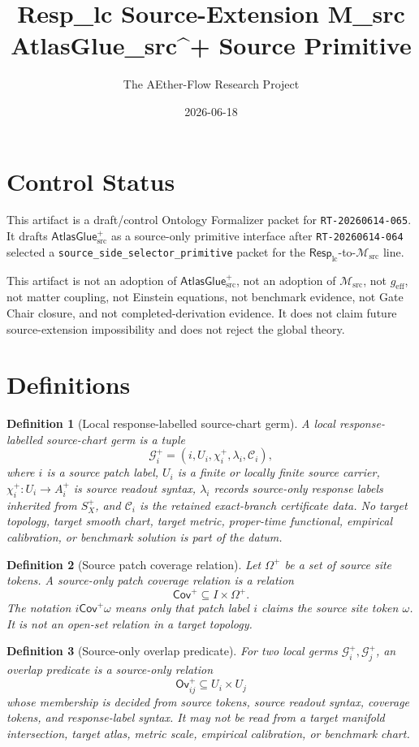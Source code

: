 \documentclass[11pt]{article}
\title{Resp\_lc Source-Extension M\_src AtlasGlue\_src\^{}+ Source Primitive}
\author{The AEther-Flow Research Project}
\date{2026-06-18}
\newcommand{\RespLC}{\mathsf{Resp}_{\mathrm{lc}}}
\newcommand{\Msrc}{\mathcal{M}_{\mathrm{src}}}
\newcommand{\geff}{g_{\mathrm{eff}}}
\newcommand{\Splus}{S_X^+}
\newcommand{\AtlasGlue}{\mathsf{AtlasGlue}_{\mathrm{src}}^{+}}
\newcommand{\Cov}{\mathsf{Cov}^{+}}
\newcommand{\Ov}{\mathsf{Ov}^{+}}
\newcommand{\Germ}{\mathcal{G}^{+}}
\newtheorem{definition}{Definition}
\begin{document}
\maketitle

\section*{Control Status}

This artifact is a draft/control Ontology Formalizer packet for
\texttt{RT-20260614-065}. It drafts \(\AtlasGlue\) as a source-only primitive
interface after \texttt{RT-20260614-064} selected a
\texttt{source\_side\_selector\_primitive} packet for the
\(\RespLC\)-to-\(\Msrc\) line.

This artifact is not an adoption of \(\AtlasGlue\), not an adoption of
\(\Msrc\), not \(\geff\), not matter coupling, not Einstein equations, not
benchmark evidence, not Gate Chair closure, and not completed-derivation
evidence. It does not claim future source-extension impossibility and does not
reject the global theory.

\section{Definitions}

\begin{definition}[Local response-labelled source-chart germ]
A local response-labelled source-chart germ is a tuple
\[
  \Germ_i=(i,U_i,\chi_i^+,\lambda_i,\mathcal C_i),
\]
where \(i\) is a source patch label, \(U_i\) is a finite or locally finite
source carrier, \(\chi_i^+:U_i\to A_i^+\) is source readout syntax,
\(\lambda_i\) records source-only response labels inherited from \(\Splus\),
and \(\mathcal C_i\) is the retained exact-branch certificate data. No target
topology, target smooth chart, target metric, proper-time functional,
empirical calibration, or benchmark solution is part of the datum.
\end{definition}

\begin{definition}[Source patch coverage relation]
Let \(\Omega^+\) be a set of source site tokens. A source-only patch coverage
relation is a relation
\[
  \Cov\subseteq I\times \Omega^+ .
\]
The notation \(i\Cov \omega\) means only that patch label \(i\) claims the
source site token \(\omega\). It is not an open-set relation in a target
topology.
\end{definition}

\begin{definition}[Source-only overlap predicate]
For two local germs \(\Germ_i,\Germ_j\), an overlap predicate is a source-only
relation
\[
  \Ov_{ij}\subseteq U_i\times U_j
\]
whose membership is decided from source tokens, source readout syntax,
coverage tokens, and response-label syntax. It may not be read from a target
manifold intersection, target atlas, metric scale, empirical calibration, or
benchmark chart.
\end{definition}
\end{document}
